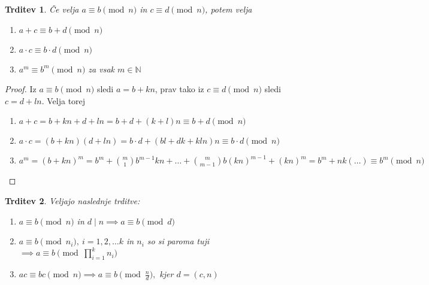\documentclass[12pt, a4paper]{article}
\newtheorem{trd}{Trditev}
\begin{document}
\begin{trd}
Če velja $a\equiv b \pmod n$ in $c\equiv d \pmod n$, potem velja
\begin{enumerate}
\item $a+c\equiv b+d \pmod n$
\item $a\cdot c\equiv b\cdot d \pmod n$
\item $a^{m}\equiv b^{m} \pmod n$ za vsak $m\in \mathbb{N}$
\end{enumerate}
\end{trd}

\begin{proof}
Iz $a\equiv b \pmod n$ sledi $a=b+kn$, prav tako iz $c\equiv d \pmod n$ sledi $c=d+ln$. Velja torej
\begin{enumerate}
\item $a+c=b+kn + d + ln= b+d +(k+l)n \equiv b+d \pmod n$
\item $a\cdot c=(b+kn)(d+ln)=b\cdot d +(bl+dk+kln)n\equiv b\cdot d\pmod n$
\item $a^{m}=(b+kn)^{m}=b^{m}+\binom{m}{1}b^{m-1}kn+\dots+\binom{m}{m-1}b(kn)^{m-1} + (kn)^{m}=b^{m}+nk(\ldots)\equiv b^{m} \pmod n$
\end{enumerate}
\end{proof}

\begin{trd}
\label{osnovne}
Veljajo naslednje trditve:
\begin{enumerate}
\item $a\equiv b \pmod n$ in $d\mid n \implies a\equiv b\pmod d$
\item $a\equiv b \pmod{n_{i}},\ i=1,2,\ldots k$ in $n_{i}$ so si paroma tuji$\implies a\equiv b\pmod {\prod_{i=1}^{k} n_{i}}$
\item $ac\equiv bc\pmod n \implies a\equiv b\pmod{\frac{n}{d}},$ kjer $d=(c,n)$
\end{enumerate}
\end{trd}
\end{document}
